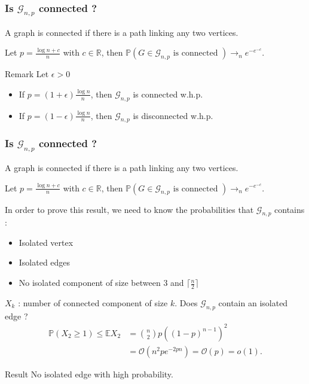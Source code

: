 \documentclass{beamer}
\begin{document}
	\begin{frame}
		\frametitle{Is $\mathcal{G}_{n,p}$ connected ?}
		\begin{definition}
			A graph is connected if there is a path linking any two vertices.
		\end{definition}
		\begin{theorem}
			Let $p = \frac{\log n + c}{n}$ with $c\in \mathbb{R}$, then
			$\mathbb{P}(G \in \mathcal{G}_{n,p}\text{ is connected } )\longrightarrow_n e^{-e^{-c}}$.
		\end{theorem}
		\begin{block}{Remark}
			Let $\epsilon >0$
			\begin{itemize}
				\item If $p = (1+\epsilon) \frac{\log n}{n}$, then $\mathcal{G}_{n,p}$ is connected w.h.p. 
				\item If $p = (1-\epsilon) \frac{\log n}{n}$, then $\mathcal{G}_{n,p}$ is disconnected w.h.p. 
			\end{itemize}
		\end{block}
	\end{frame}
	\begin{frame}	
		\frametitle{Is $\mathcal{G}_{n,p}$ connected ?}
		\begin{definition}
			A graph is connected if there is a path linking any two vertices.
		\end{definition}
		\begin{theorem}
			Let $p = \frac{\log n + c}{n}$ with $c\in \mathbb{R}$, then
			$\mathbb{P}(G \in \mathcal{G}_{n,p}\text{ is connected } )\longrightarrow_n e^{-e^{-c}}$.
		\end{theorem}

		In order to prove this result, we need to know the probabilities that $\mathcal{G}_{n,p}$ contains :
		\begin{itemize}
			\item Isolated vertex
			\item Isolated edges
			\item No isolated component of size between 3 and $\lceil \frac{n}{2} \rceil$
		\end{itemize}
	\end{frame}
	\begin{frame}
		$X_k$ : number of connected component of size $k$.
		\newline
		Does $\mathcal{G}_{n,p}$ contain an isolated edge ? 
		\begin{align}
			\mathbb{P}(X_2 \geq 1) \leq \mathbb{E} X_2 	&= \binom{n}{2}p((1-p)^{n-1})^2\\
									&= \mathcal{O}(n^2 p e^{-2pn}) = \mathcal{O}(p) = o(1).
		\end{align}
		\begin{block}{Result}
			No isolated edge with high probability.
		\end{block}
	\end{frame}
\end{document}
